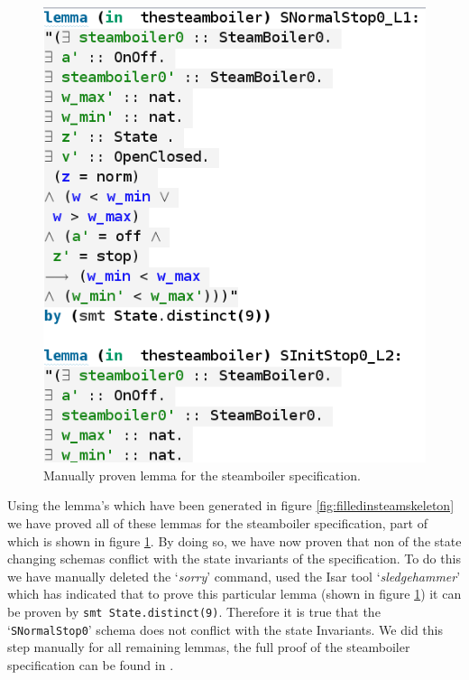 \begin{figure}[H]
\includegraphics[scale=0.5]{Figures/Evaluation/6image.png}
\caption{Manually proven lemma for the steamboiler specification. \label{fig:steamboilerproof}}
\end{figure}

Using the lemma's which have been generated in figure
\ref{fig:filledinsteamskeleton} we have proved all of these lemmas for the
steamboiler specification, part of which is shown in figure
\ref{fig:steamboilerproof}. By doing so, we have now proven that non of the
state changing schemas conflict with the state invariants of the specification.
To do this we have manually deleted the `\emph{sorry}' command, used the Isar
tool `\emph{sledgehammer}' which has indicated that to prove this particular
lemma (shown in figure \ref{fig:steamboilerproof}) it can be proven by
\verb|smt State.distinct(9)|.
Therefore it is true that the `\texttt{SNormalStop0}' schema
does not conflict with the state Invariants. We did this step manually for all
remaining lemmas, the full proof of the steamboiler specification can be found
in \cite{mathlangexamples}.



